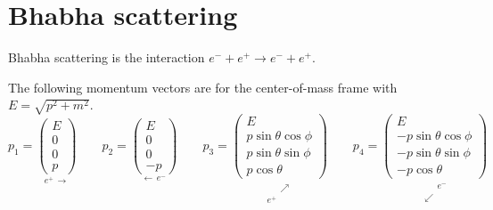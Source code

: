 

\section*{Bhabha scattering}

Bhabha scattering is the interaction $e^-+e^+\rightarrow e^-+e^+$.

\begin{center}
\end{center}

The following momentum vectors are for the center-of-mass frame with $E=\sqrt{p^2+m^2}$.
\begin{equation*}
p_1=\underset{e^+ \, \longrightarrow}
{\begin{pmatrix}E\\0\\0\\p\end{pmatrix}}
\qquad
p_2=\underset{\longleftarrow \, e^-}
{\begin{pmatrix}E\\0\\0\\-p\end{pmatrix}}
\qquad
p_3=\underset{\substack{\phantom{e^+} \, \nearrow\\e^+ \, \phantom{\nearrow}}}
{\begin{pmatrix}E\\p\sin\theta\cos\phi\\p\sin\theta\sin\phi\\p\cos\theta\end{pmatrix}}
\qquad
p_4=\underset{\substack{\phantom{\swarrow} \, e^-\\\swarrow \, \phantom{e^-}}}
{\begin{pmatrix}E\\-p\sin\theta\cos\phi\\-p\sin\theta\sin\phi\\-p\cos\theta\end{pmatrix}}
\end{equation*}

